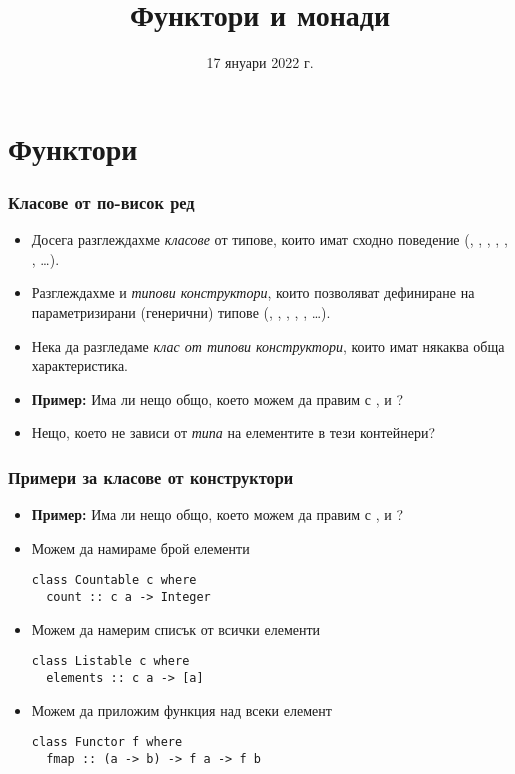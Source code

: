 \documentclass[alsotrans,beameroptions={aspectratio=169}]{beamerswitch}
\title{Функтори и монади}
\date{17 януари 2022 г.}
\begin{document}
\begin{frame}
  \titlepage
\end{frame}

\section{Функтори}

\begin{frame}[fragile]
  \frametitle{Класове от по-висок ред}

  \begin{itemize}[<+->]
  \item Досега разглеждахме \emph{класове} от типове, които имат
    сходно поведение (, , , ,
    , , \ldots).
  \item
    Разглеждахме и \emph{типови конструктори}, които позволяват дефиниране на параметризирани (генерични) типове (, \lst{[]}, , , , \ldots).
  \item
    Нека да разгледаме \emph{клас от типови конструктори}, които имат някаква обща характеристика.
  \item
    \textbf{Пример:} Има ли нещо общо, което можем да правим с \lst{[]},  и ?
  \item Нещо, което не зависи от \emph{типа} на елементите в тези контейнери?
  \end{itemize}
\end{frame}

\begin{frame}[fragile]
  \frametitle{Примери за класове от конструктори}
  \begin{itemize}[<+->]
  \item
    \textbf{Пример:} Има ли нещо общо, което можем да правим с \lst{[]},  и ?
  \item Можем да намираме брой елементи
\begin{lstlisting}
class Countable c where
  count :: c a -> Integer
\end{lstlisting}
  \item Можем да намерим списък от всички елементи
\begin{lstlisting}
class Listable c where
  elements :: c a -> [a]
\end{lstlisting}
  \item Можем да приложим функция над всеки елемент
\begin{lstlisting}
class Functor f where
  fmap :: (a -> b) -> f a -> f b
\end{lstlisting}
\end{itemize}
\end{frame}
\end{document}
